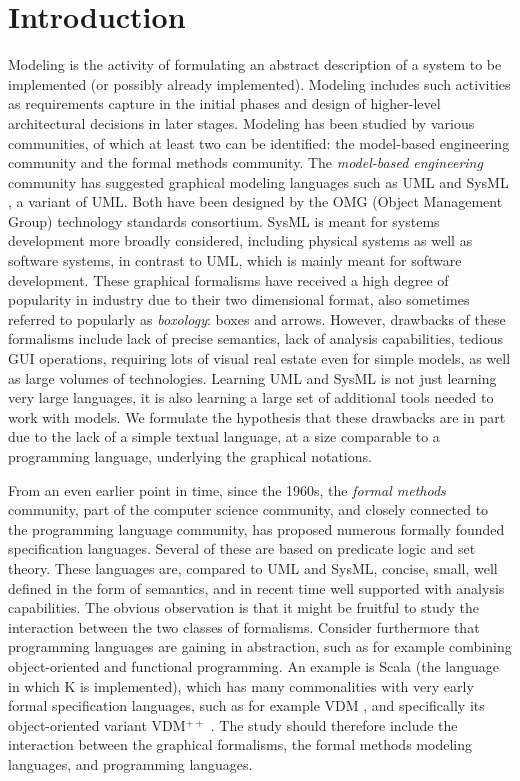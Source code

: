 \section{Introduction}
\label{sec:introduction}

Modeling is the activity of formulating an abstract description of a
system to be implemented (or possibly already implemented). Modeling
includes such activities as requirements capture in the initial phases
and design of higher-level architectural decisions in later
stages. Modeling has been studied by various communities, of which at
least two can be identified: the model-based engineering community and
the formal methods community. The {\em model-based engineering}
community has suggested graphical modeling languages such as UML
\cite{uml} and SysML \cite{sysml}, a variant of UML.  Both have been
designed by the OMG (Object Management Group) technology standards
consortium. SysML is meant for systems development more broadly
considered, including physical systems as well as software systems, in
contrast to UML, which is mainly meant for software development. These
graphical formalisms have received a high degree of popularity in
industry due to their two dimensional format, also sometimes referred
to popularly as {\em boxology}: boxes and arrows. However, drawbacks
of these formalisms include lack of precise semantics, lack of
analysis capabilities, tedious GUI operations, requiring lots
of visual real estate even for simple models, as well as large volumes
of technologies. Learning UML and SysML is not just learning very
large languages, it is also learning a large set of additional tools
needed to work with models. We formulate the hypothesis that these
drawbacks are in part due to the lack of a simple textual language, at
a size comparable to a programming language, underlying the
graphical notations.

From an even earlier point in time, since the 1960s, the {\em
  formal methods} community, part of the computer science community,
and closely connected to the programming language community, has
proposed numerous formally founded specification languages. Several of
these are based on predicate logic and set theory. These languages
are, compared to UML and SysML, concise, small, well defined in the
form of semantics, and in recent time well supported with analysis
capabilities. The obvious observation is that it might be fruitful to
study the interaction between the two classes of formalisms. Consider
furthermore that programming languages are gaining in abstraction,
such as for example combining object-oriented and functional
programming. An example is Scala (the language in which K is
implemented), which has many commonalities with very early formal
specification languages, such as for example VDM \cite{vdm78}, and
specifically its object-oriented variant VDM$^{++}$
\cite{vdmplusplus05}.  The study should therefore include the
interaction between the graphical formalisms, the formal methods
modeling languages, and programming languages.

